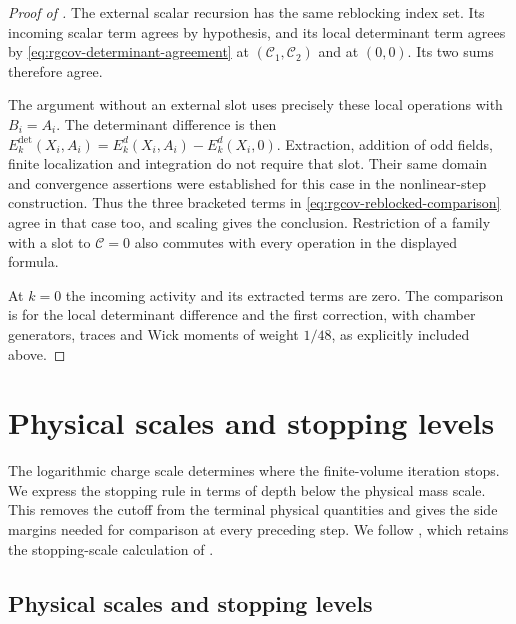 \begin{proof}[Proof of ]
The external scalar recursion has the same reblocking
index set. Its incoming scalar term agrees by hypothesis,
and its local determinant term agrees by
\eqref{eq:rgcov-determinant-agreement} at
$(\mathscr C_1,\mathscr C_2)$ and at $(0,0)$.
Its two sums therefore agree.

The argument without an external slot uses precisely
these local operations with $B_i=A_i$.
The determinant difference is then
$E_k^{\mathrm{det}}(X_i,A_i)=E_k^d(X_i,A_i)-E_k^d(X_i,0)$.
Extraction, addition of odd fields, finite localization
and integration do not require that slot. Their
same domain and convergence assertions were established
for this case in the nonlinear-step construction.
Thus the three bracketed terms in
\eqref{eq:rgcov-reblocked-comparison} agree in that
case too, and scaling gives the conclusion.
Restriction of a family with a slot to
$\mathscr C=0$ also commutes with every operation
in the displayed formula.

At $k=0$ the incoming activity and its extracted
terms are zero. The comparison is for the local
determinant difference and the first correction,
with chamber generators, traces and Wick moments
of weight $1/48$, as explicitly included above.
\end{proof}


\section{Physical scales and stopping levels}\label{sec:rg-flow}

The logarithmic charge scale determines where the finite-volume
iteration stops. We express the stopping rule in terms of depth below
the physical mass scale. This removes the cutoff from the terminal
physical quantities and gives the side margins needed for comparison
at every preceding step.
We follow \cite[\S16.1]{QED3Master}, which retains the stopping-scale
calculation of \cite[Chapter~19]{LatticeCurvature}.

\subsection{Physical scales and stopping levels}
\label{subsec:rgfl-scales}


